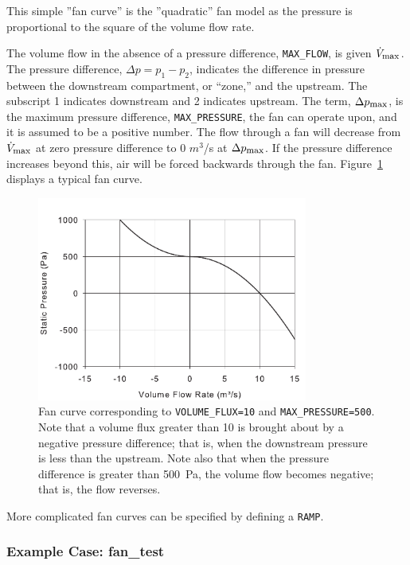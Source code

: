 \documentclass[11pt]{book}
\newcommand{\ct}{\tt\small}
\begin{document}
This simple ''fan curve'' is the ''quadratic'' fan model as the pressure is proportional to the square of the volume flow rate.

The volume flow in the absence of a pressure difference, {\ct MAX\_FLOW}, is given $\dot{V}_{\hbox{\footnotesize max}}$.  The pressure difference, $\Delta p=p_1-p_2$, indicates the difference in
pressure between the downstream compartment, or ``zone,'' and the upstream. The subscript 1 indicates downstream and 2 indicates upstream.
The term, $\Delta p_{\hbox{\footnotesize max}}$, is the maximum
pressure difference, {\ct MAX\_PRESSURE}, the fan can operate upon, and it is assumed to be a positive number.
The flow through a fan will decrease from $\dot{V}_{\hbox{\footnotesize max}}$ at zero pressure difference to 0 $m^3$/s at $\Delta p_{\hbox{\footnotesize max}}$.
If the pressure difference increases beyond this, air will be forced backwards through the fan.  Figure~\ref{fig:Fan_Curve} displays a typical fan curve.

\begin{figure}[ht!]
\begin{center}
\includegraphics[width=3.5in]{FIGURES/Fan_Curve}
\caption[Example of a fan curve.]{Fan curve corresponding to {\ct VOLUME\_FLUX=10} and {\ct MAX\_PRESSURE=500}.
Note that a volume flux greater than
10 is brought about by a negative pressure difference; that is, when the downstream pressure is less than the upstream. Note also that when
the pressure difference is greater than 500~Pa, the volume flow becomes negative; that is, the flow reverses.}
\label{fig:Fan_Curve}
\end{center}
\end{figure}

More complicated fan curves can be specified by defining a {\ct RAMP}.

\subsubsection{Example Case: {\bf fan\_test}}
\end{document}

